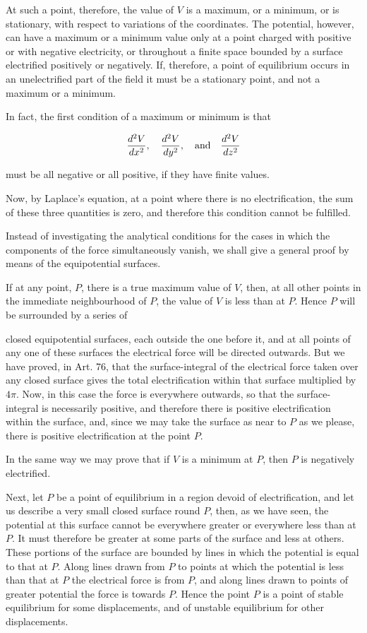 \documentclass[11pt,a4paper]{article}
\begin{document}
At such a point, therefore, the value of $V$ is a maximum, or a minimum, or is stationary, with respect to variations of the coordinates. The potential, however, can have a maximum or a minimum value only at a point charged with positive or with negative electricity, or throughout a finite space bounded by a surface electrified positively or negatively. If, therefore, a point of equilibrium occurs in an unelectrified part of the field it must be a stationary point, and not a maximum or a minimum.

In fact, the first condition of a maximum or minimum is that

\[
\frac{d^2V}{dx^2},\quad \frac{d^2V}{dy^2},\quad\hbox{and}\quad \frac{d^2V}{dz^2}
\]

must be all negative or all positive, if they have finite values.

Now, by Laplace's equation, at a point where there is no electrification, the sum of these three quantities is zero, and therefore this condition cannot be fulfilled.

Instead of investigating the analytical conditions for the cases in which the components of the force simultaneously vanish, we shall give a general proof by means of the equipotential surfaces.

If at any point, $P$, there is a true maximum value of $V$, then, at all other points in the immediate neighbourhood of $P$, the value of $V$ is less than at $P$. Hence $P$ will be surrounded by a series of

closed equipotential surfaces, each outside the one before it, and at all points of any one of these surfaces the electrical force will be directed outwards. But we have proved, in Art. 76, that the surface-integral of the electrical force taken over any closed surface gives the total electrification within that surface multiplied by $4\pi$. Now, in this case the force is everywhere outwards, so that the surface-integral is necessarily positive, and therefore there is positive electrification within the surface, and, since we may take the surface as near to $P$ as we please, there is positive electrification at the point $P$.

In the same way we may prove that if $V$ is a minimum at $P$, then $P$ is negatively electrified.

Next, let $P$ be a point of equilibrium in a region devoid of electrification, and let us describe a very small closed surface round $P$, then, as we have seen, the potential at this surface cannot be everywhere greater or everywhere less than at $P$. It must therefore be greater at some parts of the surface and less at others. These portions of the surface are bounded by lines in which the potential is equal to that at $P$. Along lines drawn from $P$ to points at which the potential is less than that at $P$ the electrical force is from $P$, and along lines drawn to points of greater potential the force is towards $P$. Hence the point $P$ is a point of stable equilibrium for some displacements, and of unstable equilibrium for other displacements.
\end{document}

